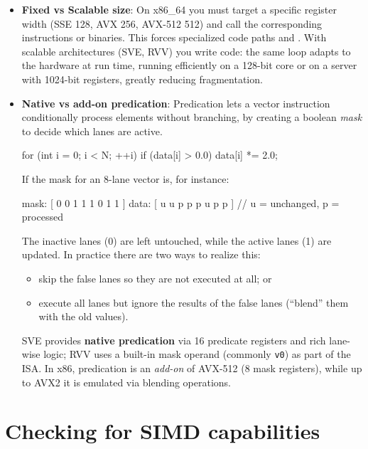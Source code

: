 \begin{itemize}
\item \textbf{Fixed vs Scalable size}: On x86\_64 you must target a specific register width (SSE 128, AVX 256, AVX-512 512) and call the corresponding instructions or binaries. This forces specialized code paths and . With scalable architectures (SVE, RVV) you write  code: the same loop adapts to the hardware at run time, running efficiently on a 128-bit core or on a server with 1024-bit registers, greatly reducing fragmentation.

\item \textbf{Native vs add-on predication}: Predication lets a vector instruction conditionally process elements without branching, by creating a boolean \emph{mask} to decide which lanes are active.

\vspace{-0.5em}
\begin{codeblock}[language=C, numbers=none]
for (int i = 0; i < N; ++i)
    if (data[i] > 0.0)
        data[i] *= 2.0;
\end{codeblock}
If the mask for an 8-lane vector is, for instance:

\vspace{-0.5em}
\begin{codeblock}[language=C, numbers=none]
mask: [ 0 0 1 1 1 0 1 1 ]
data: [ u u p p p u p p ]  // u = unchanged, p = processed
\end{codeblock}

The inactive lanes (0) are left untouched, while the active lanes (1) are updated. In practice there are two ways to realize this: 
\begin{itemize}[noitemsep]
    \item skip the false lanes so they are not executed at all; or
    \item execute all lanes but ignore the results of the false lanes (``blend'' them with the old values).
\end{itemize}

SVE provides \textbf{native predication} via 16 predicate registers and rich lane-wise logic; RVV uses a built-in mask operand (commonly \texttt{v0}) as part of the ISA. In x86, predication is an \emph{add-on} of AVX-512 (8 mask registers), while up to AVX2 it is emulated via blending operations.

\end{itemize}

\section{Checking for SIMD capabilities}

